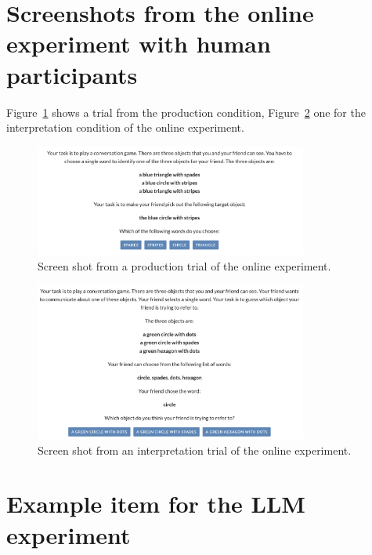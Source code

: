 \documentclass[fleqn]{article}
\begin{document}
\section{Screenshots from the online experiment with human participants}
\label{sec:scre-from-online}

Figure~\ref{fig:refgame-screenshot-production} shows a trial from the production condition, Figure~\ref{fig:refgame-screenshot-interpretation} one for the interpretation condition of the online experiment.

\begin{figure}[H]
  \centering
  \includegraphics[width = 0.8\textwidth]{00-pics/refgame-production.png}

  \caption{Screen shot from a production trial of the online experiment.}
  \label{fig:refgame-screenshot-production}
\end{figure}

\begin{figure}[H]
  \centering
  \includegraphics[width = 0.8\textwidth]{00-pics/refgame-interpretation.png}

  \caption{Screen shot from an interpretation trial of the online experiment.}
  \label{fig:refgame-screenshot-interpretation}
\end{figure}

\section{Example item for the LLM experiment}
\label{sec:examples-items-llm}
\end{document}
